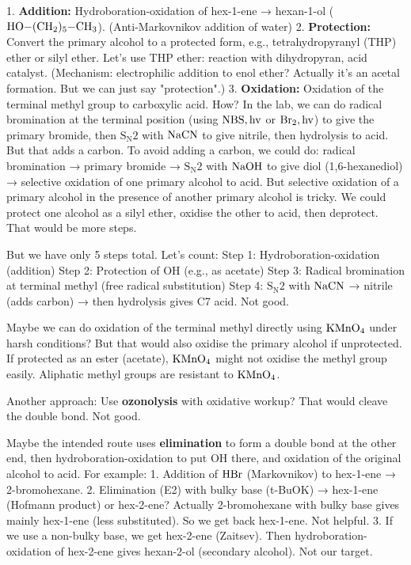\documentclass[11pt]{article}
\begin{document}
\begin{corrige}
1. \textbf{Addition:} Hydroboration-oxidation of hex-1-ene → hexan-1-ol (\(\ce{HO-(CH2)5-CH3}\)). (Anti-Markovnikov addition of water)
2. \textbf{Protection:} Convert the primary alcohol to a protected form, e.g., tetrahydropyranyl (THP) ether or silyl ether. Let's use THP ether: reaction with dihydropyran, acid catalyst. (Mechanism: electrophilic addition to enol ether? Actually it's an acetal formation. But we can just say "protection".)
3. \textbf{Oxidation:} Oxidation of the terminal methyl group to carboxylic acid. How? In the lab, we can do radical bromination at the terminal position (using \(\ce{NBS, hv}\) or \(\ce{Br2, hv}\)) to give the primary bromide, then \(\mathrm{S_N2}\) with \(\ce{NaCN}\) to give nitrile, then hydrolysis to acid. But that adds a carbon. To avoid adding a carbon, we could do: radical bromination → primary bromide → \(\mathrm{S_N2}\) with \(\ce{NaOH}\) to give diol (1,6-hexanediol) → selective oxidation of one primary alcohol to acid. But selective oxidation of a primary alcohol in the presence of another primary alcohol is tricky. We could protect one alcohol as a silyl ether, oxidise the other to acid, then deprotect. That would be more steps.

But we have only 5 steps total. Let's count:
Step 1: Hydroboration-oxidation (addition)
Step 2: Protection of OH (e.g., as acetate)
Step 3: Radical bromination at terminal methyl (free radical substitution)
Step 4: \(\mathrm{S_N2}\) with \(\ce{NaCN}\) → nitrile (adds carbon) → then hydrolysis gives C7 acid. Not good.

Maybe we can do oxidation of the terminal methyl directly using \(\ce{KMnO4}\) under harsh conditions? But that would also oxidise the primary alcohol if unprotected. If protected as an ester (acetate), \(\ce{KMnO4}\) might not oxidise the methyl group easily. Aliphatic methyl groups are resistant to \(\ce{KMnO4}\).

Another approach: Use \textbf{ozonolysis} with oxidative workup? That would cleave the double bond. Not good.

Maybe the intended route uses \textbf{elimination} to form a double bond at the other end, then hydroboration-oxidation to put OH there, and oxidation of the original alcohol to acid. For example:
1. Addition of \(\ce{HBr}\) (Markovnikov) to hex-1-ene → 2-bromohexane.
2. Elimination (E2) with bulky base (t-BuOK) → hex-1-ene (Hofmann product) or hex-2-ene? Actually 2-bromohexane with bulky base gives mainly hex-1-ene (less substituted). So we get back hex-1-ene. Not helpful.
3. If we use a non-bulky base, we get hex-2-ene (Zaitsev). Then hydroboration-oxidation of hex-2-ene gives hexan-2-ol (secondary alcohol). Not our target.


\end{corrige}
\end{document}

